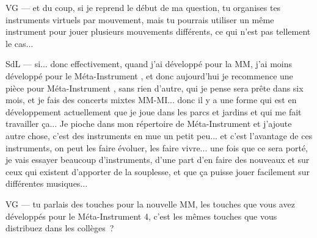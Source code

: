 VG — et du coup, si je reprend le début de ma question, tu organises tes instruments virtuels par mouvement, mais tu pourrais utiliser un même instrument pour jouer plusieurs mouvements différents, ce qui n'est pas tellement le cas... 

SdL — si... donc effectivement, quand j'ai développé pour la MM, j'ai moins développé pour le Méta-Instrument , et donc aujourd'hui je recommence une pièce pour Méta-Instrument , sans rien d'autre, qui je pense sera prête dans six mois, et je fais des concerts mixtes MM-MI... donc il y a une forme qui est en développement actuellement que je joue dans les parcs et jardins et qui me fait travailler ça... Je pioche dans mon répertoire de Méta-Instrument et j'ajoute autre chose, c'est des instruments en mue un petit peu... et c'est l'avantage de ces instruments, on peut les faire évoluer, les faire vivre... une fois que ce sera porté, je vais essayer beaucoup d'instruments, d'une part d'en faire des nouveaux et sur ceux qui existent d'apporter de la souplesse, et que ça puisse jouer facilement sur différentes musiques... 

VG — tu parlais des touches pour la nouvelle MM, les touches que vous avez développés pour le Méta-Instrument 4, c'est les mêmes touches que vous distribuez dans les collèges ? 


